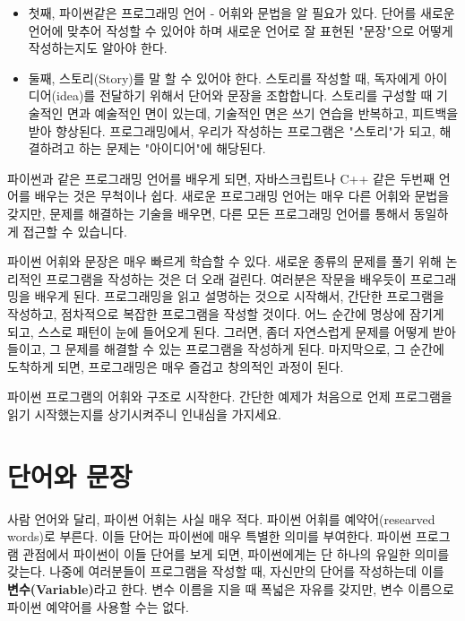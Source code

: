 \begin{itemize}

\item 첫째, 파이썬같은 프로그래밍 언어 - 어휘와 문법을 알 필요가 있다. 
단어를 새로운 언어에 맞추어 작성할 수 있어야 하며 새로운 언어로 잘 표현된 "문장"으로 어떻게 작성하는지도 알아야 한다.

\item 둘째, 스토리(Story)를 말 할 수 있어야 한다. 
스토리를 작성할 때, 독자에게 아이디어(idea)를 전달하기 위해서 단어와 문장을 조합합니다. 
스토리를 구성할 때 기술적인 면과 예술적인 면이 있는데, 기술적인 면은 쓰기 연습을  반복하고, 피트백을 받아 향상된다. 
프로그래밍에서, 우리가 작성하는 프로그램은 "스토리"가 되고, 해결하려고 하는 문제는 "아이디어"에 해당된다.

\end{itemize}

파이썬과 같은 프로그래밍 언어를 배우게 되면, 자바스크립트나 C++ 같은 두번째 언어를 배우는 것은 무척이나 쉽다. 
새로운 프로그래밍 언어는 매우 다른 어휘와 문법을 갖지만, 문제를 해결하는 기술을 배우면, 다른 모든 프로그래밍 언어를 통해서 동일하게 접근할 수 있습니다.

파이썬 어휘와 문장은 매우 빠르게 학습할 수 있다. 
새로운 종류의 문제를 풀기 위해 논리적인 프로그램을 작성하는 것은 더 오래 걸린다. 
여러분은 작문을 배우듯이 프로그래밍을 배우게 된다. 
프로그래밍을 읽고 설명하는 것으로 시작해서,
간단한 프로그램을 작성하고, 
점차적으로 복잡한 프로그램을 작성할 것이다. 
어느 순간에 명상에 잠기게 되고, 스스로 패턴이 눈에 들어오게 된다. 
그러면, 좀더 자연스럽게 문제를 어떻게 받아들이고, 그 문제를 해결할 수 있는 프로그램을 작성하게 된다. 
마지막으로, 그 순간에 도착하게 되면, 프로그래밍은 매우 즐겁고 창의적인 과정이 된다.

파이썬 프로그램의 어휘와 구조로 시작한다. 
간단한 예제가 처음으로 언제 프로그램을 읽기 시작했는지를 상기시켜주니 인내심을 가지세요.

\section{단어와 문장}


사람 언어와 달리, 파이썬 어휘는 사실 매우 적다. 
파이썬 어휘를 예약어(researved words)로 부른다. 
이들 단어는 파이썬에 매우 특별한 의미를 부여한다. 
파이썬 프로그램 관점에서 파이썬이 이들 단어를 보게 되면, 파이썬에게는 단 하나의 유일한 의미를 갖는다. 
나중에 여러분들이 프로그램을 작성할 때, 자신만의 단어를 작성하는데 이를 {\bf 변수(Variable)}라고 한다. 
변수 이름을 지을 때 폭넓은 자유를 갖지만, 변수 이름으로 파이썬 예약어를 사용할 수는 없다.

